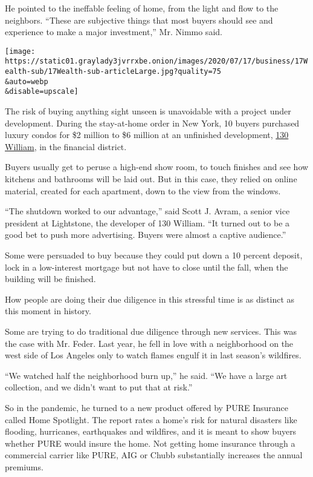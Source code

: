 He pointed to the ineffable feeling of home, from the light and flow to
the neighbors. ``These are subjective things that most buyers should see
and experience to make a major investment,'' Mr. Nimmo said.

\texttt{[image: https://static01.graylady3jvrrxbe.onion/images/2020/07/17/business/17Wealth-sub/17Wealth-sub-articleLarge.jpg?quality=75\\\&auto=webp\\\&disable=upscale]}

The risk of buying anything sight unseen is unavoidable with a project
under development. During the stay-at-home order in New York, 10 buyers
purchased luxury condos for \$2 million to \$6 million at an unfinished
development, \href{https://130william.com/}{130 William}, in the
financial district.

Buyers usually get to peruse a high-end show room, to touch finishes and
see how kitchens and bathrooms will be laid out. But in this case, they
relied on online material, created for each apartment, down to the view
from the windows.

``The shutdown worked to our advantage,'' said Scott J. Avram, a senior
vice president at Lightstone, the developer of 130 William. ``It turned
out to be a good bet to push more advertising. Buyers were almost a
captive audience.''

Some were persuaded to buy because they could put down a 10 percent
deposit, lock in a low-interest mortgage but not have to close until the
fall, when the building will be finished.

How people are doing their due diligence in this stressful time is as
distinct as this moment in history.

Some are trying to do traditional due diligence through new services.
This was the case with Mr. Feder. Last year, he fell in love with a
neighborhood on the west side of Los Angeles only to watch flames engulf
it in last season's wildfires.

``We watched half the neighborhood burn up,'' he said. ``We have a large
art collection, and we didn't want to put that at risk.''

So in the pandemic, he turned to a new product offered by PURE Insurance
called Home Spotlight. The report rates a home's risk for natural
disasters like flooding, hurricanes, earthquakes and wildfires, and it
is meant to show buyers whether PURE would insure the home. Not getting
home insurance through a commercial carrier like PURE, AIG or Chubb
substantially increases the annual premiums.

